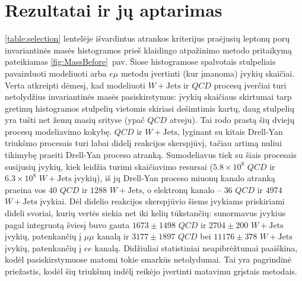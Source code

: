 \documentclass[a4paper, 12pt, oneside]{article}
\newcommand{\emu}{e\mu}
\newcommand{\WJets}{W\! +\!\mathrm{Jets}}
\newcommand{\QCD}{QC\! D}
\begin{document}
\section{Rezultatai ir jų aptarimas}
\ref{table:selection} lentelėje išvardintus atrankos kriterijus praėjusių leptonų porų invariantinės masės histogramos
prieš klaidingo atpažinimo metodo pritaikymą pateikiamas \ref{fig:MassBefore}~pav.
Šiose histogramose spalvotais stulpeliais pavaizduoti modeliuoti arba $\emu$ metodu įvertinti (kur įmanoma) įvykių skaičiai.
Verta atkreipti dėmesį, kad modeliuoti $\WJets$ ir $\QCD$ procesų įverčiai turi netolydžius invariantinės masės pasiskirstymus:
įvykių skaičiaus skirtumai tarp gretimų histogramos stulpelių vietomis skiriasi dešimtimis kartų, daug stulpelių yra tušti
net žemų masių srityse (ypač $\QCD$ atveju).
Tai rodo prastą šių dviejų procesų modeliavimo kokybę.
$\QCD$ ir $\WJets$, lyginant su kitais Drell-Yan triukšmo procesais turi labai didelį reakcijos skerspjūvį, tačiau artimą
nuliui tikimybę praeiti Drell-Yan proceso atranką.
Sumodeliavus tiek su šiais procesais susijusių įvykių, kiek leidžia turimi skaičiavimo resursai ($5.8\!\times\!10^8$ $\QCD$ ir
$6.3\!\times\!10^8$ $\WJets$ įvykių), iš jų Drell-Yan proceso miuonų kanalo atranką praeina vos $40$ $\QCD$ ir $1288$ $\WJets$,
o elektronų kanalo -- $36$ $\QCD$ ir $4974$ $\WJets$ įvykiai.
Dėl didelio reakcijos skerspjūvio šiems įvykiams priskiriami dideli svoriai, kurių vertės siekia net iki kelių tūkstančių:
sunormavus įvykius pagal integruotą šviesį buvo gauta $1673\pm1498$ $\QCD$ ir $2704\pm200$ $\WJets$ įvykių, patenkančių į
$\mu\mu$ kanalą ir $3177\pm1897$ $\QCD$ bei $11176\pm378$ $\WJets$ įvykių, patenkančių į $ee$ kanalą. 
Didžiuliai statistiniai neapibrėžtumai paaiškina, kodėl pasiskirstymuose matomi tokie smarkūs netolydumai.
Tai yra pagrindinė priežastis, kodėl šių triukšmų indėlį reikėjo įvertinti matavimu grįstais metodais.
\end{document}
